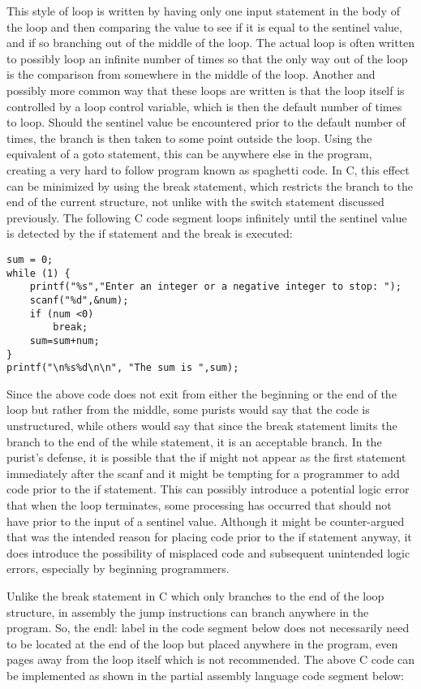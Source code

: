 \documentclass[10pt]{article}
\begin{document}
This style of loop is written by having only one input statement in the body of the loop and then comparing the value to see if it is equal to the sentinel value, and if so branching out of the middle of the loop. The actual loop is often written to possibly loop an infinite number of times so that the only way out of the loop is the comparison from somewhere in the middle of the loop. Another and possibly more common way that these loops are written is that the loop itself is controlled by a loop control variable, which is then the default number of times to loop. Should the sentinel value be encountered prior to the default number of times, the branch is then taken to some point outside the loop. Using the equivalent of a goto statement, this can be anywhere else in the program, creating a very hard to follow program known as spaghetti code. In C, this effect can be minimized by using the break statement, which restricts the branch to the end of the current structure, not unlike with the switch statement discussed previously. The following C code segment loops infinitely until the sentinel value is detected by the if statement and the break is executed:

\begin{verbatim}
sum = 0;
while (1) {
    printf("%s","Enter an integer or a negative integer to stop: ");
    scanf("%d",&num);
    if (num <0)
        break;
    sum=sum+num;
}
printf("\n%s%d\n\n", "The sum is ",sum);
\end{verbatim}

Since the above code does not exit from either the beginning or the end of the loop but rather from the middle, some purists would say that the code is unstructured, while others would say that since the break statement limits the branch to the end of the while statement, it is an acceptable branch. In the purist's defense, it is possible that the if might not appear as the first statement immediately after the scanf and it might be tempting for a programmer to add code prior to the if statement. This can possibly introduce a potential logic error that when the loop terminates, some processing has occurred that should not have prior to the input of a sentinel value. Although it might be counter-argued that was the intended reason for placing code prior to the if statement anyway, it does introduce the possibility of misplaced code and subsequent unintended logic errors, especially by beginning programmers.

Unlike the break statement in C which only branches to the end of the loop structure, in assembly the jump instructions can branch anywhere in the program. So, the endl: label in the code segment below does not necessarily need to be located at the end of the loop but placed anywhere in the program, even pages away from the loop itself which is not recommended. The above C code can be implemented as shown in the partial assembly language code segment below:
\end{document}
